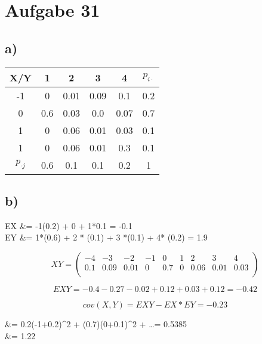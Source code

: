 \documentclass{article}
\begin{document}
	\section*{Aufgabe 31}
		\subsection*{a)}
			\begin{center}
				 \begin{tabular}{||c c c c c c||} 
					 \hline
					 X/Y & 1 & 2 & 3 & 4 & $p_{i\cdot}$\\ [0.5ex] 
					 \hline\hline
					 -1 & 0 & 0.01 & 0.09 & 0.1 & 0.2 \\ 
					 \hline
					 0 & 0.6 & 0.03 & 0.0 & 0.07 & 0.7 \\ 
					 \hline
					 1 & 0 & 0.06& 0.01 & 0.03 & 0.1 \\ 
					 \hline
					 1 & 0 & 0.06 & 0.01 & 0.3 & 0.1 \\ 
					 \hline
					 $p_{\cdot j}$ & 0.6 & 0.1 & 0.1 & 0.2 & 1 \\ [1ex] 
					 \hline
				\end{tabular}
			\end{center}
		\subsection*{b)}
			\begin{flalign*}
				EX &= -1(0.2) + 0 + 1*0.1 = -0.1\\
				EY &= 1*(0.6) + 2 * (0.1) + 3 *(0.1) + 4* (0.2) = 1.9\\
			\end{flalign*}

			\[ 
				XY = \left( 
					\begin{array}{ccccccccc}
						-4 & -3 & -2 & -1 & 0 & 1 & 2 & 3 & 4 \\
						0.1 &  0.09 & 0.01 & 0 & 0.7 & 0 & 0.06 & 0.01 & 0.03 \\
					\end{array} 
					\right)
			\]

			\[
				EXY = -0.4 -0.27 -0.02+0.12 + 0.03 + 0.12 = -0.42 
			\]

			\[
				cov(X,Y) = EXY - EX*EY = -0.23
			\]
			
			\begin{flalign*}
				 &= 0.2(-1+0.2)^2 + (0.7)(0+0.1)^2 + \dots = 0.5385\\
				 &= 1.22
			\end{flalign*}
\end{document}
